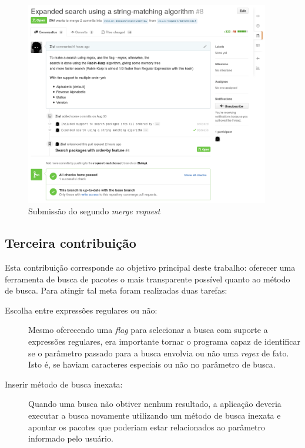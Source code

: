\begin{figure}[h]
  \centering
	\includegraphics[width=0.95\textwidth]{figuras/pr2}
  \caption{Submissão do segundo \textit{merge request}}
  \label{fig:pr2_travisok}
\end{figure}


\subsection{Terceira contribuição} %
\label{sec:terceira_contribui_o}

Esta contribuição corresponde ao objetivo principal deste trabalho: oferecer uma ferramenta de busca de pacotes o mais transparente possível quanto ao método de busca. Para atingir tal meta foram realizadas duas tarefas:

\begin{description}
	\item [Escolha entre expressões regulares ou não:] Mesmo oferecendo uma \textit{flag} para selecionar a busca com suporte a expressões regulares, era importante tornar o programa capaz de identificar se o parâmetro passado para a busca envolvia ou não uma \textit{regex} de fato. Isto é, se haviam caracteres especiais ou não no parâmetro de busca.
	\item [Inserir método de busca inexata:] Quando uma busca não obtiver nenhum resultado, a aplicação deveria executar a busca novamente utilizando um método de busca inexata e apontar os pacotes que poderiam estar relacionados ao parâmetro informado pelo usuário.
\end{description}

